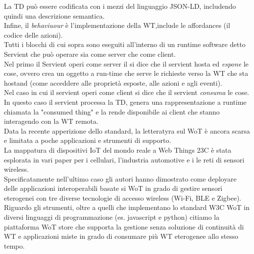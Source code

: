 \documentclass[11pt]{article}
\begin{document}
 	La TD può essere codificata con i mezzi del linguaggio JSON-LD, includendo quindi una descrizione semantica. \\
 	Infine, il \textit{behaviuour} è l'implementazione della WT,include le affordances (il codice delle azioni).\\
 	Tutti i blocchi di cui sopra sono eseguiti all'interno di un runtime software detto Servient che può operare sia come server che come client. \\
 	Nel primo il Servient operi come server il si dice che il servient hosta ed \textit{espone} le cose, ovvero crea un oggetto a run-time che serve le richieste verso la WT che sta hostand (come acceddere alle proprietà esposte, alle azioni e agli eventi).\\
 	Nel caso in cui il servient operi come client si dice che il servient \textit{consuma} le cose. In questo caso il servient  processa la TD, genera una rappresentazione a runtime chiamata la "consumed thing" e la rende disponibile ai client che stanno interagendo con la WT remota.\\
 	Data la recente apperizione dello standard, la letteratyra sul WoT è ancora scarsa e limitata a poche applicazioni e strumenti di supporto. \\
 	La mappatura di dispositivi IoT del mondo reale a Web Things 23C è stata esplorata in vari paper per i cellulari, l'industria automotive e i le reti di sensori wireless.\\
 	Specificatamente nell'ultimo caso gli autori hanno dimostrato come deployare delle applicazioni interoperabili basate si WoT in grado di gestire sensori eterogenei con tre diverse tecnologie di accesso wireless (Wi-Fi, BLE e Zigbee). \\
 	Riguardo gli strumenti, oltre a quelli che implementano lo standard W3C WoT in diversi linguaggi di programmazione (es. javascript e python) citiamo la piattaforma WoT store che supporta la gestione senza soluzione di continuità di WT e applicazioni miste in grado di consumare più WT eterogenee allo stesso tempo.
	
\end{document}
